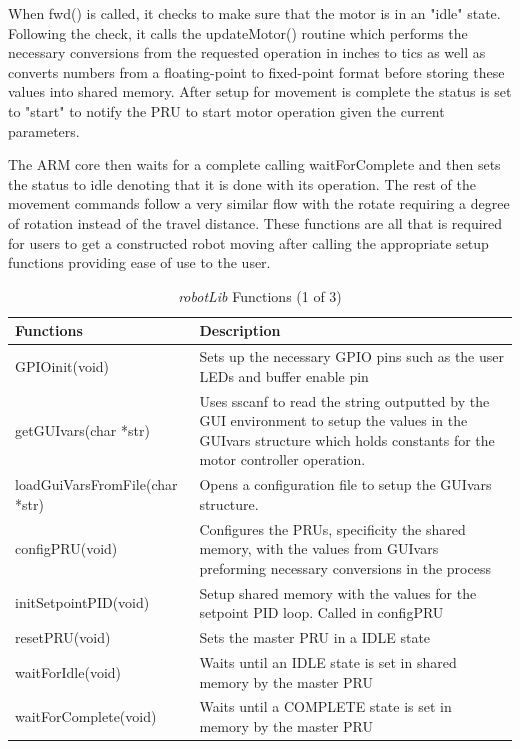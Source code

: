 \documentclass[12pt,oneside,final]{siuethesis}
\theoremstyle{definition}
\begin{document}
When fwd() is called, it checks to make sure that the motor is in an "idle" state. Following the check, it calls the updateMotor() routine which performs the necessary conversions from the requested operation in inches to tics as well as converts numbers from a floating-point to fixed-point format before storing these values into shared memory. After setup for movement is complete the status is set to "start" to notify the PRU to start motor operation given the current parameters. 

The ARM core then waits for a complete calling waitForComplete and then sets the status to idle denoting that it is done with its operation. The rest of the movement commands follow a very similar flow with the rotate requiring a degree of rotation instead of the travel distance. These functions are all that is required for users to get a constructed robot moving after calling the appropriate setup functions providing ease of use to the user. 

		
\begin{table}[htbp!]
	\centering
	\begin{tabular}{|l|p{8cm}|}
		\hline
		Functions & Description \\ \hline
		GPIOinit(void) & Sets up the necessary GPIO pins such as the user LEDs and buffer enable pin \\ \hline
		getGUIvars(char *str) & Uses sscanf to read the string outputted by the GUI environment to setup the values in the GUIvars structure which holds constants for the motor controller operation. \\ \hline
		loadGuiVarsFromFile(char *str) & Opens a configuration file to setup the GUIvars structure. \\ \hline
		configPRU(void) & Configures the PRUs, specificity the shared memory, with the values from GUIvars preforming necessary conversions in the process \\ \hline
		initSetpointPID(void) & Setup shared memory with the values for the setpoint PID loop. Called in configPRU \\ \hline
		resetPRU(void) & Sets the master PRU in a IDLE state \\ \hline
		waitForIdle(void) & Waits until an IDLE state is set in shared memory by the master PRU \\ \hline
		waitForComplete(void) & Waits until a COMPLETE state is set in memory by the master PRU \\ \hline
		
		\end{tabular}
		 \caption{\emph{robotLib} Functions (1 of 3)}
 	\label{Tab:robotLibFun1}
\end{table} 
		
\end{document}
